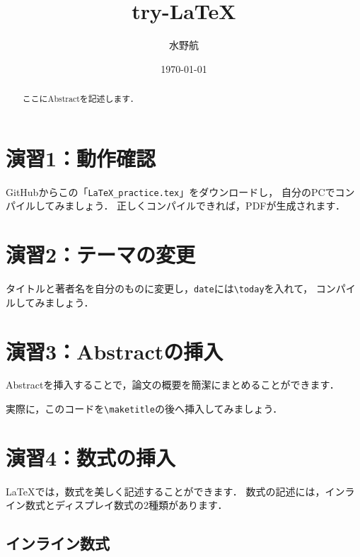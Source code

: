 \documentclass[a4paper,twocolumn]{jsarticle}
\title{%
    try-LaTeX
}
\author{水野航}
\date{\today}
\begin{document}
\maketitle

\begin{abstract}
    ここにAbstractを記述します．
\end{abstract}


\section*{演習1：動作確認}

GitHubからこの「\texttt{LaTeX\_practice.tex}」をダウンロードし，
自分のPCでコンパイルしてみましょう．
正しくコンパイルできれば，PDFが生成されます．

\section*{演習2：テーマの変更}

タイトルと著者名を自分のものに変更し，\texttt{date}には\verb|\today|を入れて，
コンパイルしてみましょう．

\section*{演習3：Abstractの挿入}

Abstractを挿入することで，論文の概要を簡潔にまとめることができます．

実際に，このコードを\verb|\maketitle|の後へ挿入してみましょう．

\section*{演習4：数式の挿入}

LaTeXでは，数式を美しく記述することができます．
数式の記述には，インライン数式とディスプレイ数式の2種類があります．

\subsection*{インライン数式}
\end{document}
